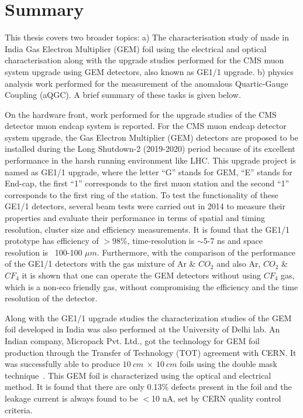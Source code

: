 \chapter{Summary} %
\label{cha:summary_&_outlook}
This thesis covers two broader topics: a) The characterisation study of made in India Gas Electron Multiplier (GEM) foil using the electrical and optical characterisation along with the upgrade studies performed for the CMS muon system upgrade using GEM detectors, also known as GE1/1 upgrade. b) physics analysis work performed for the measurement of the anomalous Quartic-Gauge Coupling (aQGC). A brief summary of these tasks is given below.

On the hardware front, work performed for the upgrade studies of the CMS detector muon endcap system is reported. For the CMS muon endcap detector system upgrade, the Gas Electron Multiplier (GEM) detectors are proposed to be installed during the Long Shutdown-2 (2019-2020) period because of its excellent performance in the harsh running environment like LHC. This upgrade project is named as GE1/1 upgrade, where the letter ``G'' stands for GEM, ``E'' stands for End-cap, the first ``1'' corresponds to the first muon station and the second ``1'' corresponds to the first ring of the station. To test the functionality of these GE1/1 detectors, several beam tests were carried out in 2014 to measure their properties and evaluate their performance in terms of spatial and timing resolution, cluster size and efficiency measurements. It is found that the GE1/1 prototype has efficiency of $>98\%$, time-resolution is $\sim$5-7 ns and space resolution is ~100-100 $\mu m$. Furthermore, with the comparison of the performance of the GE1/1 detectors with the gas mixture of Ar \& $CO_2$ and also Ar, $CO_2$ \& $CF_4$ it is shown that one can operate the GEM detectors without using $CF_4$ gas, which is a non-eco friendly gas, without compromising the efficiency and the time resolution of the detector.

Along with the GE1/1 upgrade studies the characterization studies of the GEM foil developed in India was also performed at the University of Delhi lab. An Indian company, Micropack Pvt. Ltd., got the technology for GEM foil production through the Transfer of Technology (TOT) agreement with CERN. It was successfully able to produce $10~cm~\times~10~cm$ foils using the double mask technique~\cite{DEOLIVEIRA2009}. This GEM foil is characterized using the optical and electrical method. It is found that there are only 0.13\% defects present in the foil and the leakage current is always found to be $<$10 nA, set by CERN quality control criteria.

